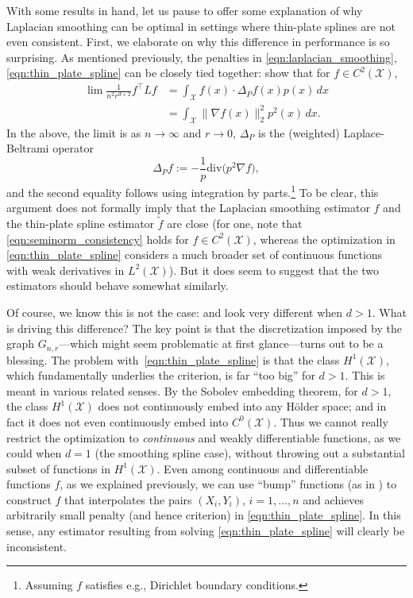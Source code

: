 \documentclass[twoside]{article}
\newcommand{\1}{\mathbf{1}}
\newcommand{\Xset}{\mathcal{X}}
\newcommand{\Leb}{L}
\newcommand{\dive}{\mathrm{div}}
\newcommand{\wt}[1]{\widetilde{#1}}
\newcommand{\wh}[1]{\widehat{#1}}
\theoremstyle{definition}
\theoremstyle{remark}
\begin{document}
With some results in hand, let us pause to offer some explanation of why Laplacian smoothing can be optimal in settings where thin-plate splines are not even consistent. First, we elaborate on why this difference in performance is so surprising. As mentioned previously, the penalties in \eqref{eqn:laplacian_smoothing}, \eqref{eqn:thin_plate_spline} can be closely tied together: \citet{bousquet03} show that for $f \in C^2(\Xset)$, 
\begin{equation}
\label{eqn:seminorm_consistency}
\begin{aligned}
\lim \frac{1}{n^2 r^{d + 2}} f^\top L f & = \int_{\Xset} f(x) \cdot \Delta_Pf(x) p(x) \,dx \\
& = \int_{\Xset} \|\nabla f(x)\|_2^2 p^2(x) \,dx.
\end{aligned}
\end{equation}
In the above, the limit is as $n \to \infty$ and $r \to 0$, $\Delta_P$ is the (weighted) Laplace-Beltrami operator
\begin{equation*}
\Delta_Pf := -\frac{1}{p} \dive\bigl(p^2\nabla f),
\end{equation*}
and the second equality follows using integration by parts.\footnote{Assuming $f$ satisfies e.g., Dirichlet boundary conditions.} To be clear, this argument does not formally imply that the Laplacian smoothing estimator $\wh{f}$ and the thin-plate spline estimator $\wt{f}$ are close (for one, note that \eqref{eqn:seminorm_consistency} holds for $f \in C^2(\Xset)$, whereas the optimization in \eqref{eqn:thin_plate_spline} considers a much broader set of continuous functions with weak derivatives in $\Leb^2(\Xset)$). But it does seem to suggest that the two estimators should behave somewhat similarly. 

Of course, we know this is not the case: \smash{$\wh{f}$} and \smash{$\wt{f}$} look very different when $d > 1$. What is driving this difference? The key point is that the discretization imposed by the graph $G_{n,r}$---which might seem problematic at first glance---turns out to be a blessing. The problem with~\eqref{eqn:thin_plate_spline} is that the class $H^1(\Xset)$, which fundamentally underlies the criterion, is far ``too big'' for $d > 1$. This is meant in various related senses. By the Sobolev embedding theorem, for $d>1$, the class $H^1(\Xset)$ does not continuously embed into any H\"{o}lder space; and in fact it does not even continuously embed into $C^0(\Xset)$. Thus we cannot really restrict the optimization to \emph{continuous} and weakly differentiable functions, as we could when $d=1$ (the smoothing spline case), without throwing out a substantial subset of functions in $H^1(\Xset)$. Even among continuous and differentiable functions $f$, as we explained previously, we can use ``bump'' functions (as in \citet{green93}) to construct $f$ that interpolates the pairs $(X_i,Y_i)$, $i=1,\ldots,n$ and achieves arbitrarily small penalty (and hence criterion) in \eqref{eqn:thin_plate_spline}. In this sense, any estimator resulting from solving \eqref{eqn:thin_plate_spline} will clearly be inconsistent. 
\end{document}
